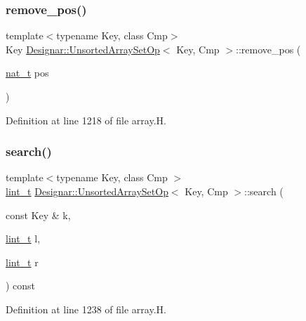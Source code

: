 \subsubsection{\texorpdfstring{remove\+\_\+pos()}{remove\_pos()}}
{\footnotesize\ttfamily template$<$typename Key, class Cmp$>$ \\
Key \hyperlink{class_designar_1_1_unsorted_array_set_op}{Designar\+::\+Unsorted\+Array\+Set\+Op}$<$ Key, Cmp $>$\+::remove\+\_\+pos (\begin{DoxyParamCaption}\item[{\hyperlink{namespace_designar_aa72662848b9f4815e7bf31a7cf3e33d1}{nat\+\_\+t}}]{pos }\end{DoxyParamCaption})\hspace{0.3cm}{\ttfamily [inline]}}



Definition at line 1218 of file array.\+H.

\mbox{\label{class_designar_1_1_unsorted_array_set_op_ac53cf73a36b29889fecf4bf06196e561}} 
\subsubsection{\texorpdfstring{search()}{search()}}
{\footnotesize\ttfamily template$<$typename Key, class Cmp $>$ \\
\hyperlink{namespace_designar_a9d113d66a39e82b73727c72cd3a52f73}{lint\+\_\+t} \hyperlink{class_designar_1_1_unsorted_array_set_op}{Designar\+::\+Unsorted\+Array\+Set\+Op}$<$ Key, Cmp $>$\+::search (\begin{DoxyParamCaption}\item[{const Key \&}]{k,  }\item[{\hyperlink{namespace_designar_a9d113d66a39e82b73727c72cd3a52f73}{lint\+\_\+t}}]{l,  }\item[{\hyperlink{namespace_designar_a9d113d66a39e82b73727c72cd3a52f73}{lint\+\_\+t}}]{r }\end{DoxyParamCaption}) const\hspace{0.3cm}{\ttfamily [protected]}}



Definition at line 1238 of file array.\+H.

\mbox{\label{class_designar_1_1_unsorted_array_set_op_a620fa45eb4c7ec033569321ecdb2eace}} 
